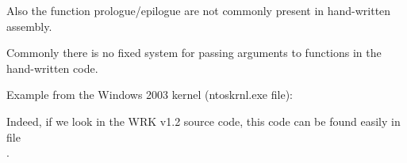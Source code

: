 \par

Also the function prologue/epilogue are not commonly present in hand-written assembly.
\par

Commonly there is no fixed system for passing arguments to functions in the hand-written code.

\par
Example from the Windows 2003 kernel 
(ntoskrnl.exe file):



Indeed, if we look in the 
\ac{WRK} v1.2 source code, this code
can be found easily in file \\
.
